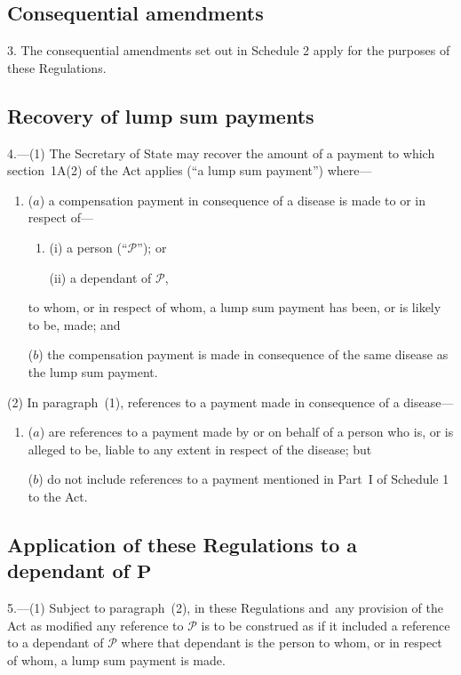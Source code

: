 \documentclass[12pt,a4paper]{article}
\begin{document}
\subsection[3. Consequential amendments]{Consequential amendments}

3.  The consequential amendments set out in Schedule 2 apply for the purposes of these Regulations.

\subsection[4. Recovery of lump sum payments]{Recovery of lump sum payments}

4.---(1)  The Secretary of State may recover the amount of a payment to which section~1A(2) of the Act applies (“a lump sum payment”) where—
\begin{enumerate}\item[]
($a$) a compensation payment in consequence of a disease is made to or in respect of—
\begin{enumerate}\item[]
(i) a person (“$\mathcal{P}$”); or

(ii) a dependant of $\mathcal{P}$,
\end{enumerate}
to whom, or in respect of whom, a lump sum payment has been, or is likely to be, made; and

($b$) the compensation payment is made in consequence of the same disease as the lump sum payment.
\end{enumerate}

(2) In paragraph~(1), references to a payment made in consequence of a disease—
\begin{enumerate}\item[]
($a$) are references to a payment made by or on behalf of a person who is, or is alleged to be, liable to any extent in respect of the disease; but

($b$) do not include references to a payment mentioned in Part~I of Schedule 1 to the Act.
\end{enumerate}

\subsection[5. Application of these Regulations to a dependant of $\mathcal{P}$]{Application of these Regulations to a dependant of $\mathbf{P}$}

5.---(1)  Subject to paragraph~(2), in these Regulations and~any provision of the Act as modified any reference to $\mathcal{P}$ is to be construed as if it included a reference to a dependant of $\mathcal{P}$ where that dependant is the person to whom, or in respect of whom, a lump sum payment is made.
\end{document}
